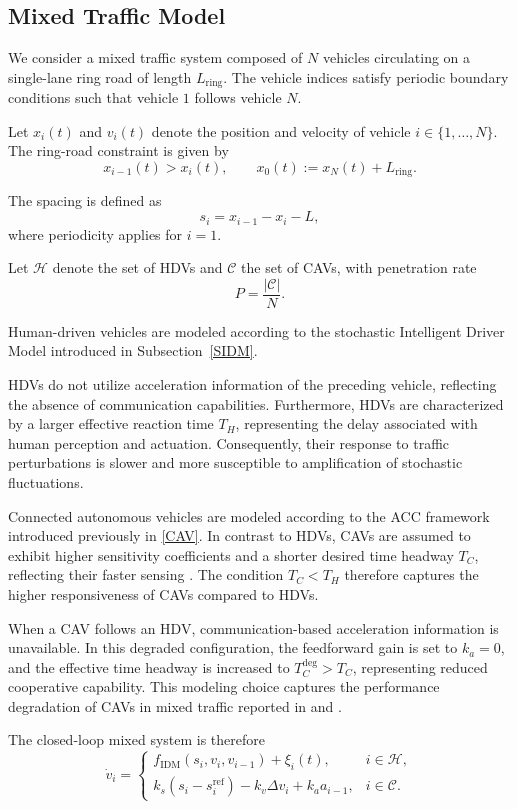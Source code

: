 \subsection{Mixed Traffic Model}

We consider a mixed traffic system composed of $N$ vehicles circulating on a single-lane ring road of length $L_{\mathrm{ring}}$. The vehicle indices satisfy periodic boundary conditions such that vehicle $1$ follows vehicle $N$.

Let $x_i(t)$ and $v_i(t)$ denote the position and velocity of vehicle $i \in \{1,\dots,N\}$. The ring-road constraint is given by
\begin{equation}
x_{i-1}(t) > x_i(t), 
\qquad
x_0(t) := x_N(t) + L_{\mathrm{ring}}.
\end{equation}

The spacing is defined as
\begin{equation}
s_i = x_{i-1} - x_i - L,
\end{equation}
where periodicity applies for $i=1$.

Let $\mathcal{H}$ denote the set of HDVs and $\mathcal{C}$ the set of CAVs, with penetration rate
\begin{equation}
P = \frac{|\mathcal{C}|}{N}.
\end{equation}

\vspace{0.5cm}

Human-driven vehicles are modeled according to the stochastic Intelligent Driver Model introduced in Subsection~\ref{SIDM}.

HDVs do not utilize acceleration information of the preceding vehicle, reflecting the absence of communication capabilities. Furthermore, HDVs are characterized by a larger effective reaction time $T_H$, representing the delay associated with human perception and actuation. Consequently, their response to traffic perturbations is slower and more susceptible to amplification of stochastic fluctuations.

\vspace{0.5cm}

Connected autonomous vehicles are modeled according to the ACC framework introduced previously in \ref{CAV}. In contrast to HDVs, CAVs are assumed to exhibit higher sensitivity coefficients and a shorter desired time headway $T_C$, reflecting their faster sensing \cite{Gong.2024}. The condition $T_C < T_H$ therefore captures the higher responsiveness of CAVs compared to HDVs.

When a CAV follows an HDV, communication-based acceleration information is unavailable. In this degraded configuration, the feedforward gain is set to $k_a = 0$, and the effective time headway is increased to $T_C^{\mathrm{deg}} > T_C$, representing reduced cooperative capability. This modeling choice captures the performance degradation of CAVs in mixed traffic reported in \cite{Gong.2024} and \cite{Cen.2025}.

\vspace{0.5cm}

The closed-loop mixed system is therefore
\begin{equation}
\dot v_i =
\begin{cases}
f_{\mathrm{IDM}}(s_i, v_i, v_{i-1}) + \xi_i(t),
& i \in \mathcal{H}, \\[6pt]
k_s ( s_i - s_i^{\mathrm{ref}} )
- k_v \Delta v_i
+ k_a a_{i-1},
& i \in \mathcal{C}.
\end{cases}
\end{equation}